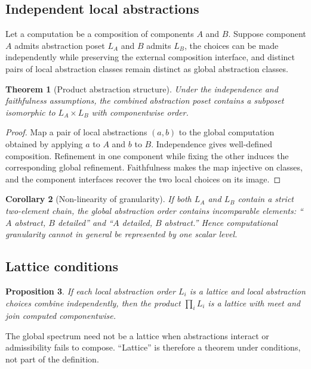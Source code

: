\documentclass[11pt,a4paper]{article}
\theoremstyle{clean}
\newtheorem{theorem}{Theorem}[section]
\newtheorem{proposition}[theorem]{Proposition}
\newtheorem{corollary}[theorem]{Corollary}
\theoremstyle{definition}
\begin{document}
\subsection{Independent local abstractions}

Let a computation be a composition of components $A$ and $B$. Suppose component $A$ admits abstraction poset $L_A$ and $B$ admits $L_B$, the choices can be made independently while preserving the external composition interface, and distinct pairs of local abstraction classes remain distinct as global abstraction classes.

\begin{theorem}[Product abstraction structure]
Under the independence and faithfulness assumptions, the combined abstraction poset contains a subposet isomorphic to $L_A\times L_B$ with componentwise order.
\end{theorem}
\begin{proof}
Map a pair of local abstractions $(a,b)$ to the global computation obtained by applying $a$ to $A$ and $b$ to $B$. Independence gives well-defined composition. Refinement in one component while fixing the other induces the corresponding global refinement. Faithfulness makes the map injective on classes, and the component interfaces recover the two local choices on its image.
\end{proof}

\begin{corollary}[Non-linearity of granularity]
If both $L_A$ and $L_B$ contain a strict two-element chain, the global abstraction order contains incomparable elements: ``$A$ abstract, $B$ detailed'' and ``$A$ detailed, $B$ abstract.'' Hence computational granularity cannot in general be represented by one scalar level.
\end{corollary}

\subsection{Lattice conditions}

\begin{proposition}
If each local abstraction order $L_i$ is a lattice and local abstraction choices combine independently, then the product $\prod_iL_i$ is a lattice with meet and join computed componentwise.
\end{proposition}

The global spectrum need not be a lattice when abstractions interact or admissibility fails to compose. ``Lattice'' is therefore a theorem under conditions, not part of the definition.
\end{document}
